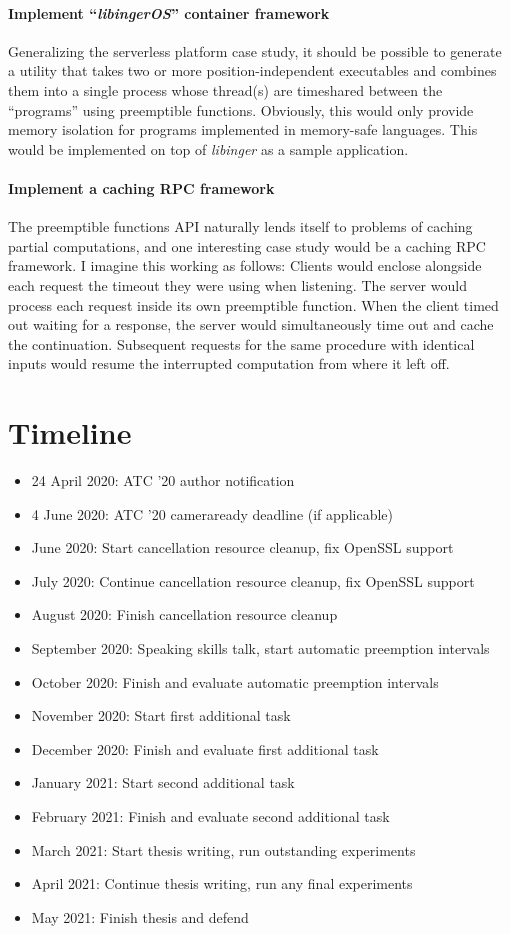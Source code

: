 \documentclass[12pt,letterpaper,openright]{report}
\begin{document}
\paragraph{Implement ``\textit{libingerOS}'' container framework}
Generalizing the serverless platform case study, it should be possible to generate a
utility that takes two or more position-independent executables and combines them
into a single process whose thread(s) are timeshared between the ``programs'' using
preemptible functions.  Obviously, this would only provide memory isolation for
programs implemented in memory-safe languages.  This would be implemented on top of
\textit{libinger} as a sample application.

\paragraph{Implement a caching RPC framework}
The preemptible functions API naturally lends itself to problems of caching partial
computations, and one interesting case study would be a caching RPC framework.  I
imagine this working as follows:  Clients would enclose alongside each request the
timeout they were using when listening.  The server would process each request inside
its own preemptible function.  When the client timed out waiting for a response, the
server would simultaneously time out and cache the continuation.  Subsequent requests
for the same procedure with identical inputs would resume the interrupted computation
from where it left off.


\section{Timeline}

\begin{itemize}
\item 24 April 2020: ATC '20 author notification
\item 4 June 2020: ATC '20 cameraready deadline (if applicable)
\item June 2020: Start cancellation resource cleanup, fix OpenSSL support
\item July 2020: Continue cancellation resource cleanup, fix OpenSSL support
\item August 2020: Finish cancellation resource cleanup
\item September 2020: Speaking skills talk, start automatic preemption intervals
\item October 2020: Finish and evaluate automatic preemption intervals
\item November 2020: Start first additional task
\item December 2020: Finish and evaluate first additional task
\item January 2021: Start second additional task
\item February 2021: Finish and evaluate second additional task
\item March 2021: Start thesis writing, run outstanding experiments
\item April 2021: Continue thesis writing, run any final experiments
\item May 2021: Finish thesis and defend
\end{itemize}


\newpage
{}

\end{document}
